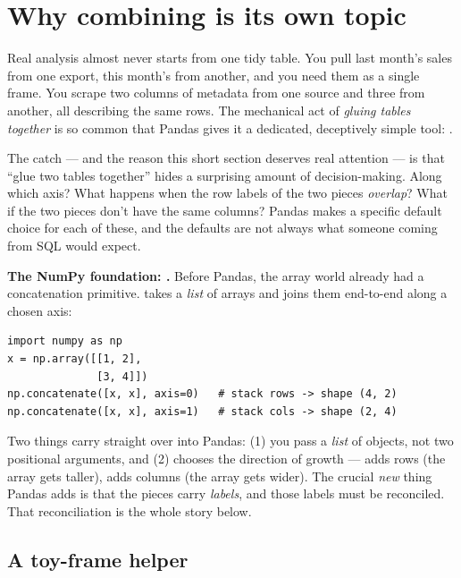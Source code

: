 \documentclass[11pt]{article}
\begin{document}

\section{Why combining is its own topic}

Real analysis almost never starts from one tidy table. You pull last month's sales from one export, this month's from another, and you need them as a single frame. You scrape two columns of metadata from one source and three from another, all describing the same rows. The mechanical act of \emph{gluing tables together} is so common that Pandas gives it a dedicated, deceptively simple tool: .

The catch --- and the reason this short section deserves real attention --- is that ``glue two tables together'' hides a surprising amount of decision-making. Along which axis? What happens when the row labels of the two pieces \emph{overlap}? What if the two pieces don't have the same columns? Pandas makes a specific default choice for each of these, and the defaults are not always what someone coming from SQL would expect.

\begin{background}
\textbf{The NumPy foundation: .} Before Pandas, the array world already had a concatenation primitive.  takes a \emph{list} of arrays and joins them end-to-end along a chosen axis:
\begin{lstlisting}
import numpy as np
x = np.array([[1, 2],
              [3, 4]])
np.concatenate([x, x], axis=0)   # stack rows -> shape (4, 2)
np.concatenate([x, x], axis=1)   # stack cols -> shape (2, 4)
\end{lstlisting}
Two things carry straight over into Pandas: (1) you pass a \emph{list} of objects, not two positional arguments, and (2)  chooses the direction of growth ---  adds rows (the array gets taller),  adds columns (the array gets wider). The crucial \emph{new} thing Pandas adds is that the pieces carry \emph{labels}, and those labels must be reconciled. That reconciliation is the whole story below.
\end{background}

\subsection{A toy-frame helper}
\end{document}
